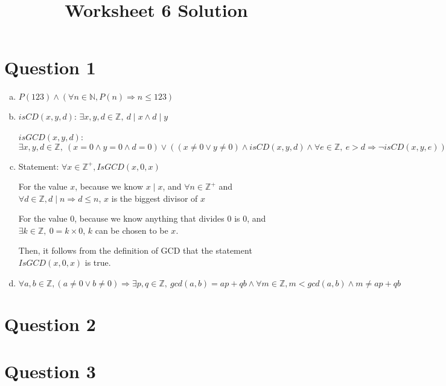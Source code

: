 \documentclass[12pt]{article}
\begin{document}
\title{Worksheet 6 Solution}
\maketitle

\section*{Question 1}
\begin{enumerate}[a.]
    \item

    $P(123) \land (\forall n \in \mathbb{N}, P(n) \Rightarrow n \leq 123)$

    \item

    $isCD(x,y,d)$: $\exists x,y,d \in \mathbb{Z},\:d \mid x \land d \mid y$

    $isGCD(x,y,d)$: $\exists x,y,d \in \mathbb{Z},\:(x = 0 \land y = 0 \land d = 0)
    \lor ((x \neq 0 \lor y \neq 0) \land isCD(x,y,d) \land \forall e \in \mathbb{Z}, \:e > d \Rightarrow \neg isCD(x,y,e))$

    \item

    Statement: $\forall x \in \mathbb{Z}^{+}, IsGCD(x,0,x)$

    \bigskip

    For the value $x$, because we know $x \mid x$, and $\forall n \in \mathbb{Z}^{+}$ and $\forall
    d \in \mathbb{Z}, d \mid n \Rightarrow d \leq n$, $x$ is the biggest divisor of $x$

    For the value $0$, because we know anything that divides 0 is 0, and
    $\exists k \in \mathbb{Z},\: 0 = k \times 0$, $k$ can be chosen to be $x$.

    Then, it follows from the definition of GCD that the statement $IsGCD(x,0,x)$ is true.

    \item

    $\forall a,b \in \mathbb{Z}, (a \neq 0 \lor b \neq 0) \Rightarrow \exists p,q \in \mathbb{Z},\:gcd(a,b) = ap + qb \land \forall m \in \mathbb{Z}, m < gcd(a,b) \land m \neq ap + qb$


\end{enumerate}

\section*{Question 2}

\section*{Question 3}
\end{document}
